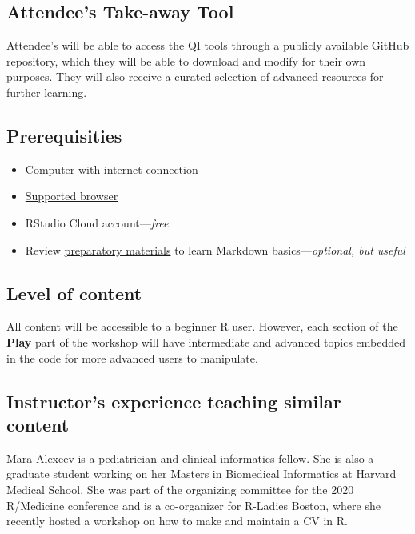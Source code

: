 \documentclass[
]{article}
\providecommand{\tightlist}{%
  \setlength{\itemsep}{0pt}\setlength{\parskip}{0pt}}
\begin{document}
\hypertarget{attendees-take-away-tool}{%
\subsection{Attendee's Take-away Tool}\label{attendees-take-away-tool}}

Attendee's will be able to access the QI tools through a publicly available GitHub repository, which they will be able to download and modify for their own purposes. They will also receive a curated selection of advanced resources for further learning.

\hypertarget{prerequisities}{%
\subsection{Prerequisities}\label{prerequisities}}

\begin{itemize}
\tightlist
\item
  Computer with internet connection
\item
  \href{https://support.rstudio.com/hc/en-us/articles/227449447-Supported-browsers-for-RStudio-Connect}{Supported browser}
\item
  RStudio Cloud account---\emph{free}
\item
  Review \href{https://commonmark.org/help/tutorial/}{preparatory materials} to learn Markdown basics---\emph{optional, but useful}
\end{itemize}

\hypertarget{level-of-content}{%
\subsection{Level of content}\label{level-of-content}}

All content will be accessible to a beginner R user. However, each section of the \textbf{Play} part of the workshop will have intermediate and advanced topics embedded in the code for more advanced users to manipulate.

\hypertarget{instructors-experience-teaching-similar-content}{%
\subsection{Instructor's experience teaching similar content}\label{instructors-experience-teaching-similar-content}}

Mara Alexeev is a pediatrician and clinical informatics fellow. She is also a graduate student working on her Masters in Biomedical Informatics at Harvard Medical School. She was part of the organizing committee for the 2020 R/Medicine conference and is a co-organizer for R-Ladies Boston, where she recently hosted a workshop on how to make and maintain a CV in R.
\end{document}
